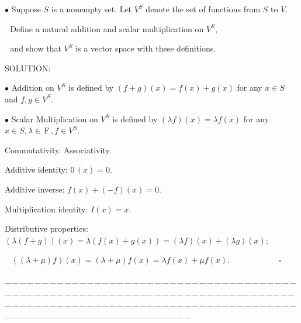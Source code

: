 \documentclass[a4paper, 11pt, UTF8]{article}
\def\Fbf{$\,{\timesbf F}\,$}
\begin{document}
\begin{large}
{\small $\bullet$} {\timessl\Large 
Suppose $S$ is a nonempty set. Let $V^S$ denote the set of functions from $S$ to $V$.}\par\,\,
{\timessl\Large Define a natural addition and scalar multiplication on $V^S$,}\par\,\,
{\timessl\Large and show that $V^S$ is a vector space with these definitions.}\par
{\timesbf S\footnotesize{OLUTION:}}\par\quad
{\tiny $\bullet$} Addition on $V^S$ is defined by $(f+g)(x)=f(x)+g(x)$ for any $x\in S$ and $f,g\in V^S$.\par\quad
{\tiny $\bullet$} Scalar Multiplication on $V^S$ is defined by $(\lambda f)(x)=\lambda f(x)$
 for any $x\in S,\lambda\in\Fbf,f\in V^S.$\par\quad
Commutativity. Associativity.\par\quad
Additive identity: $0\,(x)=0.$\par\quad
Additive inverse: $f(x)+(-f)(x)=0$.\par\quad
Multiplication identity: $I(x)=x$.\par\quad
Distributive properties: $(\lambda(f+g))(x)=\lambda(f(x)+g(x))=(\lambda f)(x)+(\lambda g)(x);$\par\qquad\qquad\qquad\qquad\qquad\,\,\,
$((\lambda+\mu)f)(x)=(\lambda+\mu)f(x)=\lambda f(x)+\mu f(x).\qquad\qquad\qquad\square$\par
{\tiny \_\,\_\,\_\,\_\,\_\,\_\,\_\,\_\,\_\,\_\,\_\,\_\,\_\,\_\,\_\,\_\,\_\,\_\,\_\,\_\,\_\,\_\,\_\,\_\,\_\,\_\,\_\,\_\,\_\,\_\,\_\,\_\,\_\,\_\,\_\,\_\,\_\,\_\,\_\,\_\,\_\,\_\,\_\,\_\,\_\,\_\,\_\,\_\,\_\,\_\,\_\,\_\,\_\,\_\,\_\,\_\,\_\,\_\,\_\,\_\,\_\,\_\,\_\,\_\,\_\,\_\,\_\,\_\,\_\,\_\,\_\_\,\_\,\_\,\_\,\_\,\_\,\_\,\_\,\_\,\_\,\_\,\_\,\_\,\_\,\_\,\_\,\_\,\_\,\_\,\_\,\_\,\_\,\_\,\_\,\_\,\_\,\_\,\_\,\_\,\_\,\_\,\_\,\_\,\_\,\_\,\_\,\_\,\_\,\_\,\_\,\_\,\_\,\_\,\_\,\_\,\_\,\_\,\_\,\_\,\_\,\_\,\_\,\_\,\_\,\_\,\_\,\_\,\_\,\_\,\_\,\_\,\_\,\_\,\_\,\_\,\_\,\_\,\_\,\_\,\_\,\_}{\tiny\,\par}


\end{large}
\end{document}
